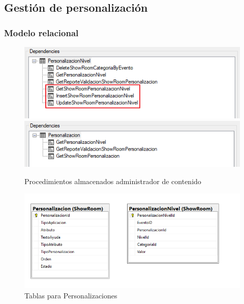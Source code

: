 \documentclass[a4paper,11pt]{paper}
\begin{document}
\newpage
\subsection{Gestión de personalización}

\subsubsection{Modelo relacional}
\begin{figure}[h]
\centering
\includegraphics[width=1.0\textwidth]{imgs/Personalizacion/SPsAdmPersonalizacionNivel.png}
\includegraphics[width=1.0\textwidth]{imgs/Personalizacion/SPsAdmPersonalizacion.png}
\caption{Procedimientos almacenados administrador de contenido}
\end{figure}

\begin{figure}[!h]
\centering
\includegraphics[width=1.0\textwidth]{imgs/Personalizacion/Tablas.png}
\caption{Tablas para Personalizaciones}
\end{figure}
\end{document}
